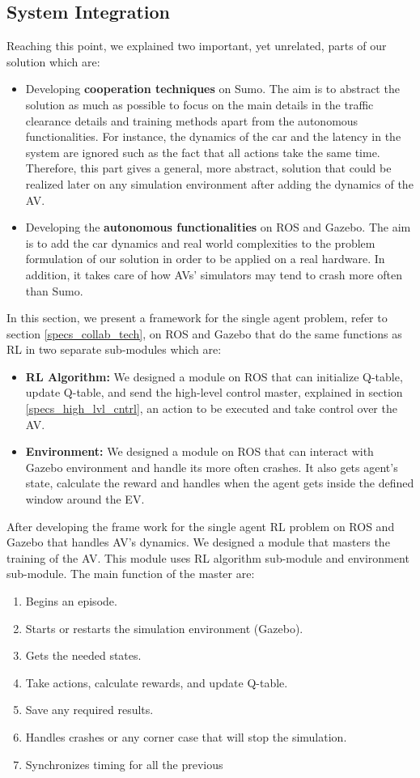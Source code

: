 \subsection{System Integration}
\label{specs_integr}
Reaching this point, we explained two important, yet unrelated, parts of our solution which are:
\begin{itemize}
    \item Developing \textbf{cooperation techniques} on Sumo. The aim is to abstract the solution as much as possible to focus on the main details in the traffic clearance details and training methods apart from the autonomous functionalities. For instance, the dynamics of the car and the latency in the system are ignored such as the fact that all actions take the same time. Therefore, this part gives a general, more abstract, solution that could be realized later on any simulation environment after adding the dynamics of the AV. 
    \item Developing the \textbf{autonomous functionalities} on ROS and Gazebo. The aim is to add the car dynamics and real world complexities to the problem formulation of our solution in order to be applied on a real hardware. In addition, it takes care of how AVs' simulators may tend to crash more often than Sumo.
\end{itemize}
In this section, we present a framework for the single agent problem, refer to section \ref{specs_collab_tech}, on ROS and Gazebo that do the same functions as RL in two separate sub-modules which are:
\begin{itemize}
    \item \textbf{RL Algorithm:} We designed a module on ROS that can initialize Q-table, update Q-table, and send the high-level control master, explained in section \ref{specs_high_lvl_cntrl}, an action to be executed and take control over the AV. 
    \item \textbf{Environment:} We designed a module on ROS that can interact with Gazebo environment and handle its more often crashes. It also gets agent's state, calculate the reward and handles when the agent gets inside the defined window around the EV. 
\end{itemize}

After developing the frame work for the single agent RL problem on ROS and Gazebo that handles AV's dynamics. We designed a module that masters the training of the AV. This module uses RL algorithm sub-module and environment sub-module. The main function of the master are:
\begin{enumerate}
    \item Begins an episode. 
    \item Starts or restarts the simulation environment (Gazebo).
    \item Gets the needed states.
    \item Take actions, calculate rewards, and update Q-table.
    \item Save any required results.
    \item Handles crashes or any corner case that will stop the simulation.
    \item Synchronizes timing for all the previous 
\end{enumerate}


